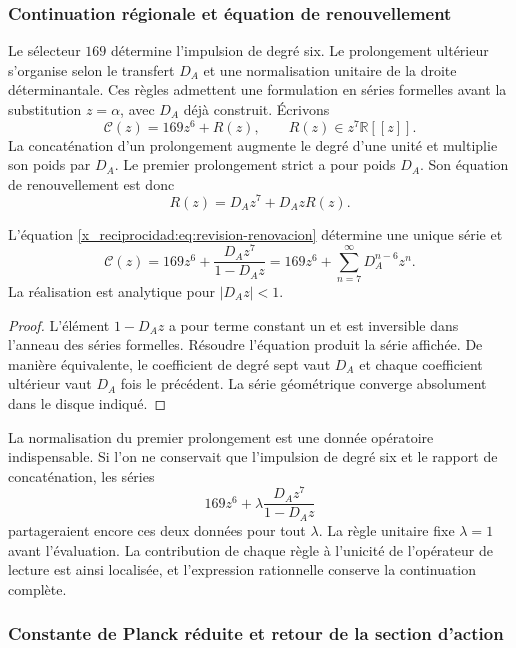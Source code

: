 \subsubsection{Continuation régionale et équation de renouvellement}

Le sélecteur \(169\) détermine l'impulsion de degré six. Le prolongement
ultérieur s'organise selon le transfert \(D_A\) et une normalisation
unitaire de la droite déterminantale. Ces règles admettent une formulation
en séries formelles avant la substitution \(z=\alpha\), avec \(D_A\) déjà
construit. Écrivons
\[
 \mathscr C(z)=169z^6+R(z),\qquad R(z)\in z^7\mathbb R[[z]].
\]
La concaténation d'un prolongement augmente le degré d'une unité et
multiplie son poids par \(D_A\). Le premier prolongement strict a pour
poids \(D_A\). Son équation de renouvellement est donc
\begin{equation}
 R(z)=D_Az^7+D_AzR(z).
 \label{x_reciprocidad:eq:revision-renovacion}
\end{equation}

\begin{proposition}
L'équation \eqref{x_reciprocidad:eq:revision-renovacion} détermine une unique série et
\[
 \mathscr C(z)=169z^6+\frac{D_Az^7}{1-D_Az}
             =169z^6+\sum_{n=7}^{\infty}D_A^{n-6}z^n.
\]
La réalisation est analytique pour \(|D_Az|<1\).
\end{proposition}
\begin{proof}
L'élément \(1-D_Az\) a pour terme constant un et est inversible
dans l'anneau des séries formelles. Résoudre l'équation produit la série
affichée. De manière équivalente, le coefficient de degré sept vaut \(D_A\)
et chaque coefficient ultérieur vaut \(D_A\) fois le précédent. La série
géométrique converge absolument dans le disque indiqué.
\end{proof}

La normalisation du premier prolongement est une donnée opératoire
indispensable. Si l'on ne conservait que l'impulsion de degré six et
le rapport de concaténation, les séries
\[
 169z^6+\lambda\frac{D_Az^7}{1-D_Az}
\]
partageraient encore ces deux données pour tout \(\lambda\).
La règle unitaire fixe \(\lambda=1\) avant l'évaluation.
La contribution de chaque règle à l'unicité de l'opérateur de lecture
est ainsi localisée, et l'expression rationnelle conserve la continuation complète.

\subsubsection{Constante de Planck réduite et retour de la section d'action}

